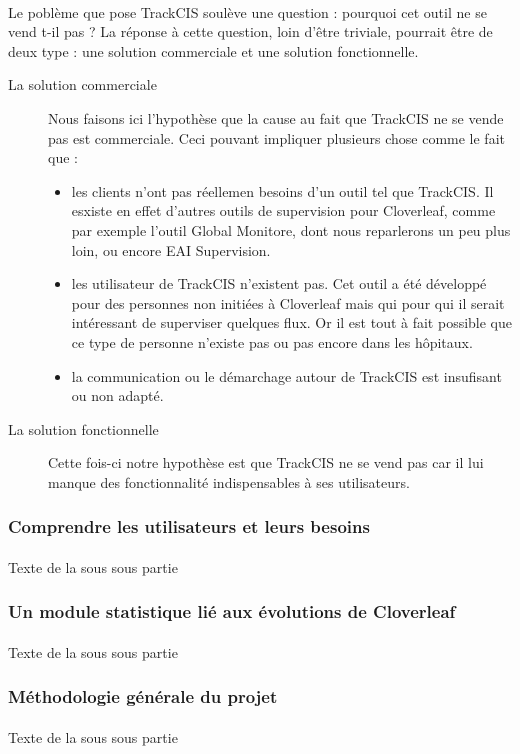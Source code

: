 		\paragraph{}%
		Le poblème que pose TrackCIS soulève une question : pourquoi cet outil ne se
		vend t-il pas ? La réponse à cette question, loin d'être triviale, pourrait
		être de deux type : une solution commerciale et une solution fonctionnelle.
		\begin{description}
			\item[La solution commerciale] Nous faisons ici l'hypothèse que la cause au
			fait que TrackCIS ne se vende pas est commerciale. Ceci pouvant impliquer
			plusieurs chose comme le fait que :
			\begin{itemize}
			  \item les clients n'ont pas réellemen besoins d'un outil tel que TrackCIS.
			  Il esxiste en effet d'autres outils de supervision pour Cloverleaf, comme
			  par exemple l'outil Global Monitore, dont nous reparlerons un peu plus
			  loin, ou encore EAI Supervision.
			  \item les utilisateur de TrackCIS n'existent pas. Cet outil a été développé
			  pour des personnes non initiées à Cloverleaf mais qui pour qui il serait
			  intéressant de superviser quelques flux.
			  Or il est tout à fait possible que ce type de personne n'existe pas ou pas
			  encore dans les hôpitaux.
			  \item la communication ou le démarchage autour de TrackCIS est insufisant
			  ou non adapté.
			\end{itemize}
			\item[La solution fonctionnelle] Cette fois-ci notre hypothèse est que
			TrackCIS ne se vend pas car il lui manque des fonctionnalité indispensables à
			ses utilisateurs.
		\end{description}
		
		\subsubsection{Comprendre les utilisateurs et leurs besoins}
			\paragraph{}
			Texte de la sous sous partie
		\subsubsection{Un module statistique lié aux évolutions de Cloverleaf}
			\paragraph{}
			Texte de la sous sous partie
		\subsubsection{Méthodologie générale du projet}
			\paragraph{}
			Texte de la sous sous partie
			